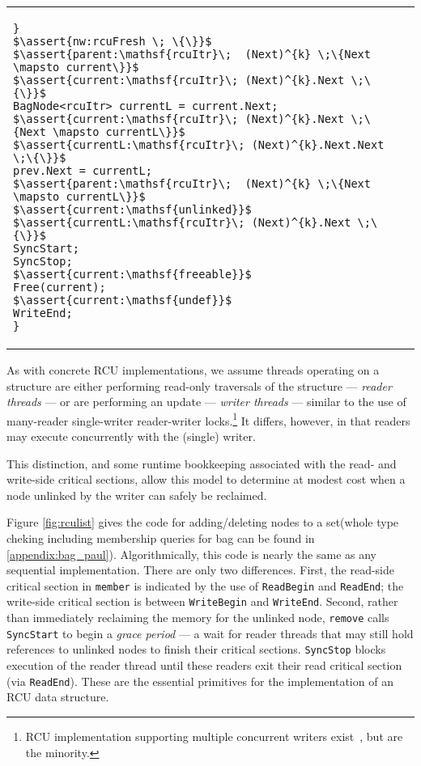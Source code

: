 \begin{figure*}[t!]
\begin{tabular}{p{}p{}}
\begin{lstlisting}[basicstyle=\scriptsize\ttfamily]
}
$\assert{nw:rcuFresh \; \{\}}$
$\assert{parent:\mathsf{rcuItr}\;  (Next)^{k} \;\{Next \mapsto current\}}$
$\assert{current:\mathsf{rcuItr}\; (Next)^{k}.Next \;\{\}}$
BagNode<rcuItr> currentL = current.Next;
$\assert{current:\mathsf{rcuItr}\; (Next)^{k}.Next \;\{Next \mapsto currentL\}}$
$\assert{currentL:\mathsf{rcuItr}\; (Next)^{k}.Next.Next \;\{\}}$
prev.Next = currentL;
$\assert{parent:\mathsf{rcuItr}\;  (Next)^{k} \;\{Next \mapsto currentL\}}$
$\assert{current:\mathsf{unlinked}}$
$\assert{currentL:\mathsf{rcuItr}\; (Next)^{k}.Next \;\{\}}$
SyncStart;
SyncStop;
$\assert{current:\mathsf{freeable}}$
Free(current);
$\assert{current:\mathsf{undef}}$
WriteEnd;
}
\end{lstlisting}
\end{tabular}
\vspace{-2em}
\caption{Read-Copy-Update Client: Linked-List based Bag Implementation.}
\label{fig:rculist}
\end{figure*}

As with concrete RCU implementations, we assume threads operating on a structure are either performing read-only traversals of the structure --- \emph{reader threads} --- or are performing an update --- \emph{writer threads} --- similar to the use of many-reader single-writer reader-writer locks.\footnote{RCU implementation supporting multiple concurrent writers exist~\cite{Arbel:2014:CUR:2611462.2611471}, but are the minority.}  It differs, however, in that readers may execute concurrently with the (single) writer.

This distinction, and some runtime bookkeeping associated with the read- and write-side critical sections, allow this model to determine at modest cost when a node unlinked by the writer can safely be reclaimed.

Figure \ref{fig:rculist} gives the code for adding/deleting nodes to a set(whole type cheking including membership queries for bag can be found in \ref{appendix:bag_paul}). Algorithmically, this code is nearly the same as any sequential implementation. There are only two differences.
First, the read-side critical section in \texttt{member} is indicated by the use of \lstinline|ReadBegin| and \lstinline|ReadEnd|; the write-side critical section is between \lstinline|WriteBegin| and \lstinline|WriteEnd|.
Second, rather than immediately reclaiming the memory for the unlinked node, \texttt{remove} calls \lstinline|SyncStart| to begin a \emph{grace period} --- a wait for reader threads that may still hold references to unlinked nodes to finish their critical sections.
 \lstinline|SyncStop| blocks execution of the reader thread until these readers exit their read critical section (via \lstinline|ReadEnd|). These are the essential primitives for the implementation of an RCU data structure.

